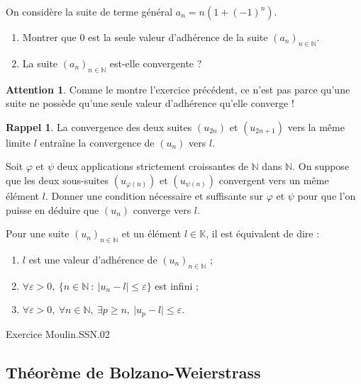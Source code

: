 \documentclass[french]{article}
\newcommand{\N}{\mathbb{N}}
\newcommand{\K}{\mathbb{K}}
\theoremstyle{plain}
\theoremstyle{definition}
\newtheorem*{rappel}{Rappel}
\newtheorem*{attention}{Attention}
\theoremstyle{remark}
\begin{document}
\begin{exo}
	On considère la suite de terme général $a_n=n(1+(-1)^n)$.
	\begin{enumerate}
		\item Montrer que $0$ est la seule valeur d'adhérence de la suite $(a_n)_{n\in\N}$.
		\item La suite $(a_n)_{n\in\N}$ est-elle convergente ?
	\end{enumerate}
\end{exo}

\begin{attention}
	Comme le montre l'exercice précédent, ce n'est pas parce qu'une suite ne possède qu'une seule valeur d'adhérence qu'elle converge !
\end{attention}

\begin{rappel}
	La convergence des deux suites $(u_{2n})$ et $(u_{2n+1})$ vers la même limite $l$ entraîne la convergence de $(u_n)$ vers $l$.
\end{rappel}

\begin{exo}
	Soit $\varphi$ et $\psi$ deux applications strictement croissantes de $\N$ dans $\N$. On suppose que les deux sous-suites $(u_{\varphi(n)})$ et $(u_{\psi(n)})$ convergent vers un même élément $l$. Donner une condition nécessaire et suffisante sur $\varphi$ et $\psi$ pour que l'on puisse en déduire que $(u_n)$ converge vers $l$.
\end{exo}

\begin{prop}
	Pour une suite $(u_n)_{n\in\N}$ et un élément $l\in\K$, il est équivalent de dire :
	\begin{enumerate}[label=(\roman*)]
		\item $l$ est une valeur d'adhérence de $(u_n)_{n\in\N}$ ;
		\item $\forall\varepsilon>0,\ \{n\in\N\ :\ \lvert u_n-l\rvert\leqslant\varepsilon\}$ est infini ;
		\item $\forall\varepsilon>0,\ \forall n\in\N,\ \exists p\geqslant n,\ \lvert u_p-l\rvert\leqslant\varepsilon$.
	\end{enumerate}	
\end{prop}

Exercice Moulin.SSN.02

\subsection{Théorème de Bolzano-Weierstrass}
\end{document}
